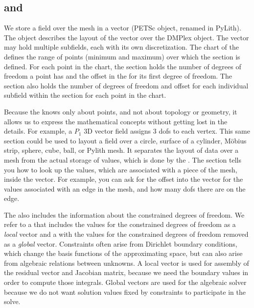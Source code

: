\subsection{ and }
\label{sec:developer:petsc:section}

We store a field over the mesh in a vector (PETSc  object,
renamed  in PyLith). The  object
describes the layout of the vector over the DMPlex object. The vector
may hold multiple subfields, each with its own discretization. The
chart of the  defines the range of points
(minimum and maximum) over which the section is defined. For each
point in the chart, the section holds the number of degrees of freedom
a point has and the offset in the  for its first
degree of freedom. The section also holds the number of
degrees of freedom and offset for each individual subfield within the
section for each point in the chart.

Because the  knows only about points, and not
about topology or geometry, it allows us to express the mathematical
concepts without getting lost in the details. For example, a $P_1$ 3D
vector field assigns 3 dofs to each vertex. This same section could be
used to layout a field over a circle, surface of a cylinder, M\"obius
strip, sphere, cube, ball, or Pylith mesh. It separates the layout of
data over a mesh from the actual storage of values, which is done by
the . The section tells you how to look up the
values, which are associated with a piece of the mesh, inside the
vector. For example, you can ask for the offset into the vector for
the values associated with an edge in the mesh, and how many dofs
there are on the edge.

The  also includes the information about the
constrained degrees of freedom. We refer to a  that
includes the values for the constrained degrees of freedom as a {\em
  local} vector and a  with the values for the
constrained degrees of freedom removed as a {\em global}
vector. Constraints often arise from Dirichlet boundary conditions,
which change the basis functions of the approximating space, but can
also arise from algebraic relations between unknowns. A local vector
is used for assembly of the residual vector and Jacobian matrix,
because we need the boundary values in order to compute those
integrals. Global vectors are used for the algebraic solver because we
do not want solution values fixed by constraints to participate in the
solve.

